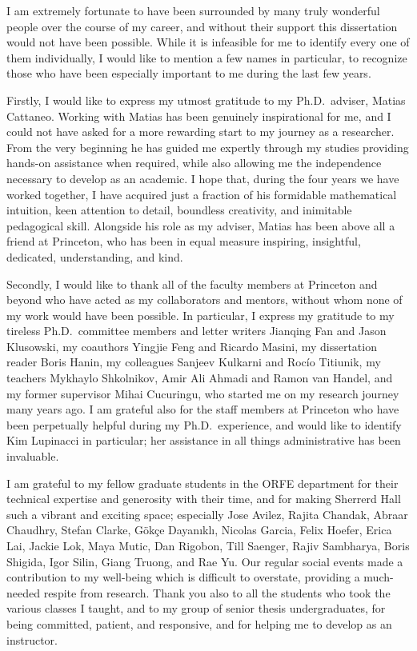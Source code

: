
I am extremely fortunate to have been surrounded by many truly wonderful people
over the course of my career, and without their support this dissertation would
not have been possible. While it is infeasible for me to identify every one of
them individually, I would like to mention a few names in particular, to
recognize those who have been especially important to me during the last few
years.

Firstly, I would like to express my utmost gratitude to my Ph.D.\ adviser,
Matias Cattaneo. Working with Matias has been genuinely inspirational for me,
and I could not have asked for a more rewarding start to my journey as a
researcher. From the very beginning he has guided me expertly through my
studies providing hands-on assistance when required, while also allowing me the
independence necessary to develop as an academic. I hope that, during the four
years we have worked together, I have acquired just a fraction of his formidable
mathematical intuition, keen attention to detail, boundless creativity, and
inimitable pedagogical skill. Alongside his role as my adviser, Matias has been
above all a friend at Princeton, who has been in equal measure inspiring,
insightful, dedicated, understanding, and kind.

Secondly, I would like to thank all of the faculty members at Princeton and
beyond who have acted as my collaborators and mentors, without whom none of my
work would have been possible. In particular, I express my gratitude to my
tireless Ph.D.\ committee members and letter writers Jianqing Fan and Jason
Klusowski, my coauthors Yingjie Feng and Ricardo Masini, my dissertation reader
Boris Hanin, my colleagues Sanjeev Kulkarni and Roc{\'i}o Titiunik, my teachers
Mykhaylo Shkolnikov, Amir Ali Ahmadi and Ramon van Handel, and my former
supervisor Mihai Cucuringu, who started me on my research journey many years
ago. I am grateful also for the staff members at Princeton who have been
perpetually helpful during my Ph.D.\ experience, and would like to identify Kim
Lupinacci in particular; her assistance in all things administrative has been
invaluable.

I am grateful to my fellow graduate students in the ORFE department for their
technical expertise and generosity with their time, and for making Sherrerd
Hall such a vibrant and exciting space; especially Jose Avilez, Rajita Chandak,
Abraar Chaudhry, Stefan Clarke, G{\"o}k{\c c}e Dayan{\i}kl{\i}, Nicolas Garcia,
Felix Hoefer, Erica Lai, Jackie Lok, Maya Mutic, Dan Rigobon, Till Saenger,
Rajiv Sambharya, Boris Shigida, Igor Silin, Giang Truong, and Rae Yu. Our
regular social events made a contribution to my well-being which is difficult
to overstate, providing a much-needed respite from research. Thank you also to
all the students who took the various classes I taught, and to my group of
senior thesis undergraduates, for being committed, patient, and responsive, and
for helping me to develop as an instructor.

